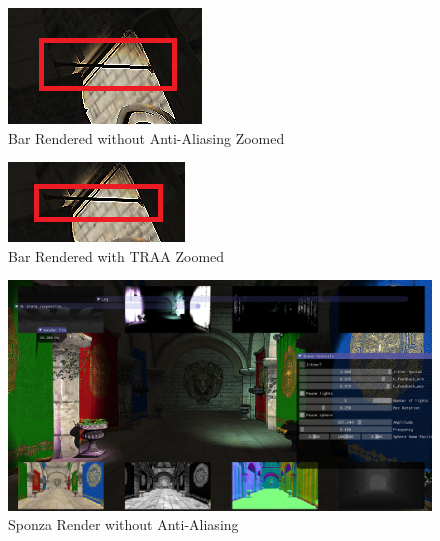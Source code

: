 \documentclass{acmsiggraph}               %
\begin{document}
\begin{figure}[H]
    \centering
    \includegraphics[width=0.9\columnwidth]{NO_AA_Zoom.png}
    \caption{Bar Rendered without Anti-Aliasing Zoomed}
    \label{fig_NO_AA_Zoom}
\end{figure}

\begin{figure}[H]
    \centering
    \includegraphics[width=0.9\columnwidth]{TRAA_Zoom.png}
    \caption{Bar Rendered with TRAA Zoomed}
    \label{fig_TRAA_Zoom}
\end{figure}

\begin{figure}[H]
    \centering
    \includegraphics[width=0.9\columnwidth]{NO_AA_2.png}
    \caption{Sponza Render without Anti-Aliasing}
    \label{fig_NO_AA_2}
\end{figure}
\end{document}
